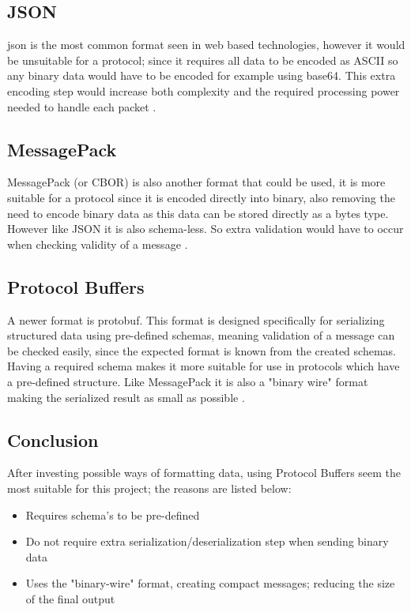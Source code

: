 \subsection*{JSON}
\acrfull{json} is the most common format seen in web based technologies, however it would be unsuitable for a protocol; since it requires all data to be encoded as ASCII so any binary data would have to be encoded for example using base64. This extra encoding step would increase both complexity and the required processing power needed to handle each packet \parencite{json-rfc8259}.

\subsection*{MessagePack}
MessagePack (or CBOR) is also another format that could be used, it is more suitable for a protocol since it is encoded directly into binary, also removing the need to encode binary data as this data can be stored directly as a bytes type. However like JSON it is also schema-less. So extra validation would have to occur when checking validity of a message \parencite{msgpack} \parencite{cbor-rfc8949}.

\subsection*{Protocol Buffers}
A newer format is protobuf. This format is designed specifically for serializing structured data using pre-defined schemas, meaning validation of a message can be checked easily, since the expected format is known from the created schemas. Having a required schema makes it more suitable for use in protocols which have a pre-defined structure. Like MessagePack it is also a "binary wire" format making the serialized result as small as possible \parencite{protobuf-3}.

\subsection*{Conclusion}
After investing possible ways of formatting data, using Protocol Buffers seem the most suitable for this project; the reasons are listed below:

\begin{itemize}
    \item Requires schema's to be pre-defined
    \item Do not require extra serialization/deserialization step when sending binary data
    \item Uses the "binary-wire" format, creating compact messages; reducing the size of the final output
\end{itemize}


